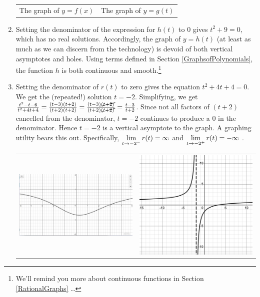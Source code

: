 \begin{ex}
\begin{enumerate}
\begin{center}
\begin{tabular}{cc}
The graph of $y=f(x)$  \hspace{0.75in} & The graph of $y=g(t)$ \\


\end{tabular}
\end{center} 

\item  Setting the denominator of the expression for $h(t)$ to $0$ gives $t^2+9 = 0$, which has no real solutions.  Accordingly, the graph of $y=h(t)$ (at least as much as we can discern from the technology) is devoid of both vertical asymptotes and holes.  Using terms defined in Section \ref{GraphsofPolynomials},  the function $h$ is both continuous and smooth.\footnote{We'll remind you more about continuous functions in Section \ref{RationalGraphs}  \ldots}

\item  Setting the denominator of $r(t)$ to zero gives the equation $t^2+4t+4 = 0$.  We get  the (repeated!) solution $t=-2$.  Simplifying, we get  $\frac{t^2-t-6}{t^2+4t+4} = \frac{(t-3)(t+2)}{(t+2)(t+2)}  =  \frac{(t-3)\cancel{(t+2)}}{(t+2)\cancel{(t+2)}} =  \frac{t-3}{t+2}$.  Since  not all factors of $(t+2)$ cancelled from the denominator, $t=-2$ continues to produce a $0$ in the denominator.  Hence $t=-2$ is a vertical asymptote to the graph.  A graphing utility bears this out.  Specifically,     $\ds{\lim_{t \rightarrow -2^{-}} r(t) = \infty}$ and  $\ds{\lim_{t \rightarrow -2^{+}} r(t) = -\infty}$ .

\begin{center}

\begin{tabular}{cc}

\includegraphics[width=3in]{./IntroRationalGraphics/VAorHoleEx03.jpg} & \includegraphics[width=3in]{./IntroRationalGraphics/VAorHoleEx04.png} \\


\end{tabular}
\end{center}
\end{enumerate}
\end{ex}

